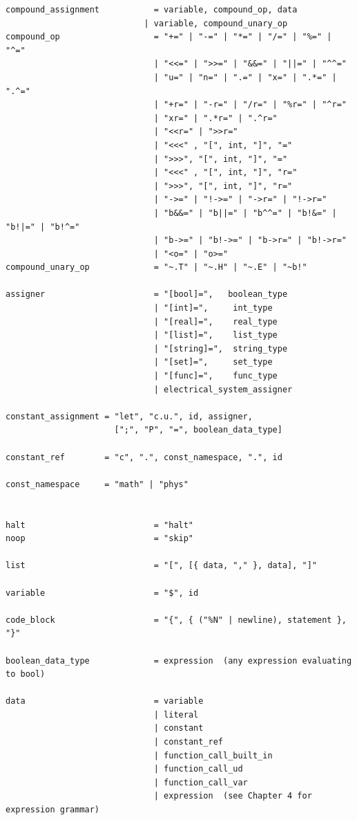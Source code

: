 \begin{verbatim}
compound_assignment           = variable, compound_op, data
                            | variable, compound_unary_op
compound_op                   = "+=" | "-=" | "*=" | "/=" | "%=" | "^="
                              | "<<=" | ">>=" | "&&=" | "||=" | "^^="
                              | "u=" | "n=" | ".=" | "x=" | ".*=" | ".^="
                              | "+r=" | "-r=" | "/r=" | "%r=" | "^r="
                              | "xr=" | ".*r=" | ".^r="
                              | "<<r=" | ">>r="
                              | "<<<" , "[", int, "]", "="
                              | ">>>", "[", int, "]", "="
                              | "<<<" , "[", int, "]", "r="
                              | ">>>", "[", int, "]", "r="
                              | "->=" | "!->=" | "->r=" | "!->r="
                              | "b&&=" | "b||=" | "b^^=" | "b!&=" | "b!|=" | "b!^="
                              | "b->=" | "b!->=" | "b->r=" | "b!->r="
                              | "<o=" | "o>="
compound_unary_op             = "~.T" | "~.H" | "~.E" | "~b!"

assigner                      = "[bool]=",   boolean_type
                              | "[int]=",     int_type
                              | "[real]=",    real_type
                              | "[list]=",    list_type
                              | "[string]=",  string_type
                              | "[set]=",     set_type
                              | "[func]=",    func_type
                              | electrical_system_assigner

constant_assignment = "let", "c.u.", id, assigner, 
                      [";", "P", "=", boolean_data_type]

constant_ref        = "c", ".", const_namespace, ".", id

const_namespace     = "math" | "phys"


halt                          = "halt"
noop                          = "skip"

list                          = "[", [{ data, "," }, data], "]"

variable                      = "$", id

code_block                    = "{", { ("%N" | newline), statement }, "}"

boolean_data_type             = expression  (any expression evaluating to bool)

data                          = variable
                              | literal
                              | constant
                              | constant_ref
                              | function_call_built_in
                              | function_call_ud
                              | function_call_var
                              | expression  (see Chapter 4 for expression grammar)


\end{verbatim}
